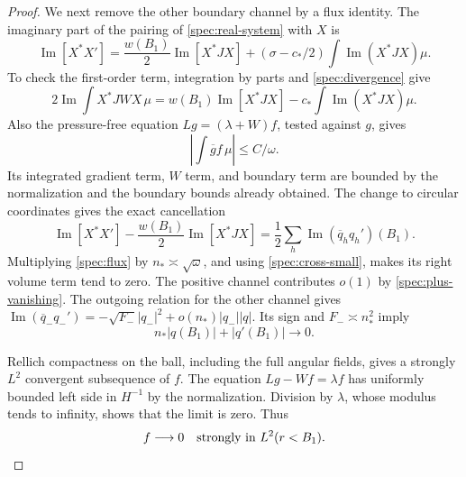\documentclass[11pt]{article}
\numberwithin{equation}{section}
\theoremstyle{definition}
\theoremstyle{remark}
\begin{document}
\begin{proof}
We next remove the other boundary channel by a flux identity.
The imaginary part of the pairing of \eqref{spec:real-system} with
$X$ is
\begin{equation}\label{spec:flux}
 \operatorname{Im}[X^*X']
 =\frac{w(B_1)}2\operatorname{Im}[X^*JX]
 +(\sigma-c_*/2)\int\operatorname{Im}(X^*JX)\mu.
\end{equation}
To check the first-order term, integration by parts and
\eqref{spec:divergence} give
\[
2\operatorname{Im}\int X^*JW X\,\mu
=w(B_1)\operatorname{Im}[X^*JX]-c_*\int\operatorname{Im}(X^*JX)\mu.
\]
Also the pressure-free equation $Lg=(\lambda+W)f$, tested against $g$,
gives
\begin{equation}\label{spec:cross-small}
 \left|\int\overline g f\,\mu\right|\le C/\omega.
\end{equation}
Its integrated gradient term, $W$ term, and boundary term are bounded
by the normalization and the boundary bounds already obtained.
The change to circular coordinates gives the exact cancellation
\[
 \operatorname{Im}[X^*X']
 -\frac{w(B_1)}2\operatorname{Im}[X^*JX]
 =\frac12\sum_h\operatorname{Im}(\overline q_hq_h')(B_1).
\]
Multiplying \eqref{spec:flux} by $n_*\asymp\sqrt\omega$, and using
\eqref{spec:cross-small}, makes its right volume term tend to zero.
The positive channel contributes $o(1)$ by
\eqref{spec:plus-vanishing}. The outgoing relation for the other
channel gives
$\operatorname{Im}(\overline q_-q_-')=-\sqrt{F_-}|q_-|^2+
o(n_*)|q_-||q|$. Its sign and $F_-\asymp n_*^2$ imply
\begin{equation}\label{spec:all-boundary-small}
 n_*|q(B_1)|+|q'(B_1)|\longrightarrow0.
\end{equation}

Rellich compactness on the ball, including the full angular fields,
gives a strongly $L^2$ convergent subsequence of $f$. The equation
$Lg-Wf=\lambda f$ has uniformly bounded left side in $H^{-1}$ by
the normalization. Division by $\lambda$, whose modulus tends to
infinity, shows that the limit is zero. Thus
\begin{equation}\label{spec:f-small}
 f\longrightarrow0\quad\hbox{strongly in }L^2(r<B_1).
\end{equation}


\end{proof}
\end{document}
